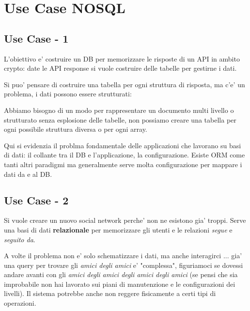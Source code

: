 \chapter{Use Case NOSQL}

\section{Use Case - 1}

L'obiettivo e' costruire un DB per memorizzare le risposte di un API in ambito crypto: date le API response si vuole costruire delle tabelle per gestirne i dati.


Si puo' pensare di costruire una tabella per ogni struttura di risposta, ma c'e' un problema, i dati possono essere strutturati:


Abbiamo bisogno di un modo per rappresentare un documento multi livello o strutturato senza esplosione delle tabelle, non possiamo creare una tabella per ogni possibile struttura diversa o per ogni array.


Qui si evidenzia il problma fondamentale delle applicazioni che lavorano su basi di dati: il collante tra il DB e l'applicazione, la configurazione.
Esiste ORM come tanti altri paradigmi ma generalmente serve molta configurazione per mappare i dati da e al DB.


\section{Use Case - 2}

Si vuole creare un nuovo social network perche' non ne esistono gia' troppi. Serve una basi di dati \textbf{relazionale} per memorizzare gli utenti e le relazioni \textit{segue} e \textit{seguito da}.


A volte il problema non e' solo schematizzare i dati, ma anche interagirci ... gia' una query per trovare gli \textit{amici degli amici} e' "complessa", figuriamoci se dovessi andare avanti con gli \textit{amici degli amici degli amici degli amici} (se pensi che sia improbabile non hai lavorato sui piani di manutenzione e le configurazioni dei livelli).
Il sistema potrebbe anche non reggere fisicamente a certi tipi di operazioni.

